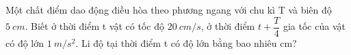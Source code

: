 \begin{ex}%
Một chất điểm dao động điều hòa theo phương ngang với chu kì T và biên độ $5\ cm$. Biết ở thời điểm t vật có tốc độ $20\ cm/s$, ở thời điểm $t +\dfrac{T}{4}$ gia tốc của vật có độ lớn $1\ m/s^2$. Li độ tại thời điểm t có độ lớn bằng bao nhiêu cm?
\end{ex} 






























